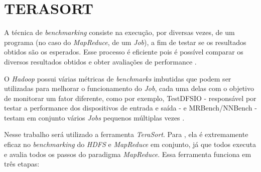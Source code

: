 \section{TERASORT} \label{sec:terasort}

A técnica de \textit{benchmarking} consiste na execução, por diversas vezes, de um programa (no caso do \textit{MapReduce}, de um \textit{Job}), a fim de testar se os resultados obtidos são os esperados. Esse processo é eficiente pois é possível comparar os diversos resultados obtidos e obter avaliações de performance \cite{HadoopBook15}.

O \textit{Hadoop} possui várias métricas de \textit{benchmarks} imbutidas que podem ser utilizadas para melhorar o funcionamento do \textit{Job}, cada uma delas com o objetivo de monitorar um fator diferente, como por exemplo, TestDFSIO  - responsável por testar a performance dos dispositivos de entrada e saída - e MRBench/NNBench - testam em conjunto vários \textit{Jobs} pequenos múltiplas vezes \cite{HadoopBook15}.

Nesse trabalho será utilizado a ferramenta \textit{TeraSort}. Para \textcite{HadoopBook15}, ela é extremamente eficaz no \textit{benchmarking} do \textit{HDFS} e \textit{MapReduce} em conjunto, já que todos executa e avalia todos os passos do paradigma \textit{MapReduce}. Essa ferramenta funciona em três etapas:

